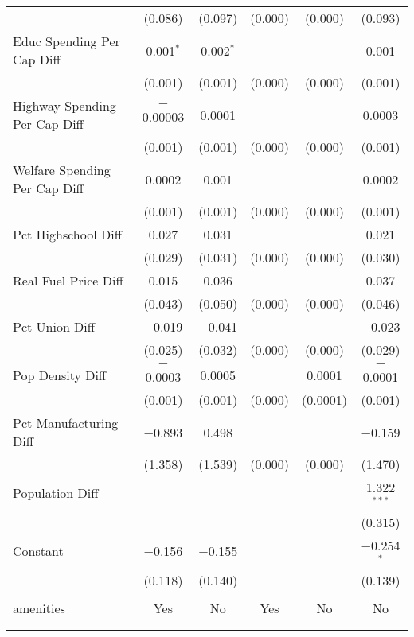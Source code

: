\begin{table}[!htbp]
\begin{tabular}{@{\extracolsep{5pt}}lccccc}
  & (0.086) & (0.097) & (0.000) & (0.000) & (0.093) \\ 
  Educ Spending Per Cap Diff & 0.001$^{*}$ & 0.002$^{*}$ &  &  & 0.001 \\ 
  & (0.001) & (0.001) & (0.000) & (0.000) & (0.001) \\ 
  Highway Spending Per Cap Diff & $-$0.00003 & 0.0001 &  &  & 0.0003 \\ 
  & (0.001) & (0.001) & (0.000) & (0.000) & (0.001) \\ 
  Welfare Spending Per Cap Diff & 0.0002 & 0.001 &  &  & 0.0002 \\ 
  & (0.001) & (0.001) & (0.000) & (0.000) & (0.001) \\ 
  Pct Highschool Diff & 0.027 & 0.031 &  &  & 0.021 \\ 
  & (0.029) & (0.031) & (0.000) & (0.000) & (0.030) \\ 
  Real Fuel Price Diff & 0.015 & 0.036 &  &  & 0.037 \\ 
  & (0.043) & (0.050) & (0.000) & (0.000) & (0.046) \\ 
  Pct Union Diff & $-$0.019 & $-$0.041 &  &  & $-$0.023 \\ 
  & (0.025) & (0.032) & (0.000) & (0.000) & (0.029) \\ 
  Pop Density Diff & $-$0.0003 & 0.0005 &  & 0.0001 & $-$0.0001 \\ 
  & (0.001) & (0.001) & (0.000) & (0.0001) & (0.001) \\ 
  Pct Manufacturing Diff & $-$0.893 & 0.498 &  &  & $-$0.159 \\ 
  & (1.358) & (1.539) & (0.000) & (0.000) & (1.470) \\ 
  Population Diff &  &  &  &  & 1.322$^{***}$ \\ 
  &  &  &  &  & (0.315) \\ 
  Constant & $-$0.156 & $-$0.155 &  &  & $-$0.254$^{*}$ \\ 
  & (0.118) & (0.140) &  &  & (0.139) \\ 
 \hline \\[-1.8ex] 
amenities & Yes & No & Yes & No & No \\ 
\hline \\[-1.8ex] 
\hline 
\hline \\[-1.8ex] 
\end{tabular} 
\end{table} 
